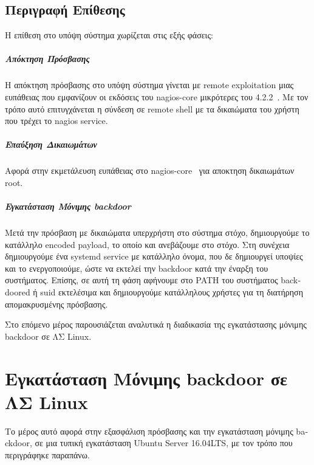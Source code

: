 \documentclass[12pt]{report}
\begin{document}
\section{Περιγραφή Επίθεσης}
Η επίθεση στο υπόψη σύστημα χωρίζεται στις εξής φάσεις:

\paragraph{Απόκτηση Πρόσβασης}
Η απόκτηση πρόσβασης στο υπόψη σύστημα γίνεται με \textlatin{remote exploitation} μιας ευπάθειας που εμφανίζουν οι εκδόσεις του \textlatin{nagios-core} μικρότερες του 4.2.2~\cite{exploit:01}. Με τον τρόπο αυτό επιτυγχάνεται η σύνδεση σε \textlatin{remote shell} με τα δικαιώματα του χρήστη που τρέχει το \textlatin{nagios service}.

\paragraph{Επαύξηση Δικαιωμάτων}
Αφορά στην εκμετάλευση ευπάθειας στο \textlatin{nagios-core}~\cite{exploit:02} για αποκτηση δικαιωμάτων \textlatin{root}.

\paragraph{Εγκατάσταση Μόνιμης \textlatin{backdoor}}
Μετά την πρόσβαση με δικαιώματα υπερχρήστη στο σύστημα στόχο, δημιουργούμε το κατάλληλο \textlatin{encoded payload}, το οποίο και ανεβάζουμε στο στόχο. Στη συνέχεια δημιουργούμε ένα \textlatin{systemd service} με κατάλληλο όνομα, που δε δημιουργεί υποψίες και το ενεργοποιούμε, ώστε να εκτελεί την \textlatin{backdoor} κατά την έναρξη του συστήματος. Επίσης, σε αυτή τη φάση αφήνουμε στο \textlatin{PATH} του συστήματος \textlatin{backdoored} ή \textlatin{suid} εκτελέσιμα και δημιουργούμε κατάλληλους χρήστες για τη διατήρηση απομακρυσμένης πρόσβασης.

Στο επόμενο μέρος παρουσιάζεται αναλυτικά η διαδικασία της εγκατάστασης μόνιμης \textlatin{backdoor} σε ΛΣ \textlatin{Linux}.

\chapter{Εγκατάσταση Μόνιμης \textlatin{backdoor} σε ΛΣ \textlatin{Linux}}
Το μέρος αυτό αφορά στην εξασφάλιση πρόσβασης και την εγκατάσταση μόνιμης \textlatin{backdoor}, σε μια τυπική εγκατάσταση \textlatin{Ubuntu Server 16.04LTS}, με τον τρόπο που περιγράφηκε παραπάνω.
\end{document}
